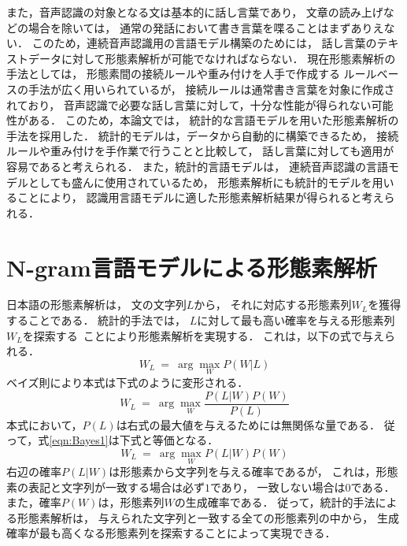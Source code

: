 また，音声認識の対象となる文は基本的に話し言葉であり，
文章の読み上げなどの場合を除いては，
通常の発話において書き言葉を喋ることはまずありえない．
このため，連続音声認識用の言語モデル構築のためには，
話し言葉のテキストデータに対して形態素解析が可能でなければならない．
現在形態素解析の手法としては，
形態素間の接続ルールや重み付けを人手で作成する
ルールベースの手法が広く用いられているが，
接続ルールは通常書き言葉を対象に作成されており，
音声認識で必要な話し言葉に対して，十分な性能が得られない可能性がある．
このため，本論文では，
統計的な言語モデルを用いた形態素解析の手法を採用した．
統計的モデルは，データから自動的に構築できるため，
接続ルールや重み付けを手作業で行うことと比較して，
話し言葉に対しても適用が容易であると考えられる．
また，統計的言語モデルは，
連続音声認識の言語モデルとしても盛んに使用されているため，
形態素解析にも統計的モデルを用いることにより，
認識用言語モデルに適した形態素解析結果が得られると考えられる．



\section{N-gram言語モデルによる形態素解析}
日本語の形態素解析は，
文の文字列$L$から，
それに対応する形態素列$W_L$を獲得することである．
統計的手法では，
$L$に対して最も高い確率を与える形態素列$W_L$\mbox{を探索する
ことにより}形態素解析を実現する．
これは，以下の式で与えられる．
\begin{equation}
W_L ~=~ \arg \max_{W} P(W|L)
\end{equation}
ベイズ則により本式は下式のように変形される．
\begin{equation}
W_L ~=~ \arg \max_W \frac{P(L|W)P(W)}{P(L)}
\label{eqn:Bayes1}
\end{equation}
本式において，$P(L)$は右式の最大値を与えるためには無関係な量である．
従って，式\ref{eqn:Bayes1}は下式と等価となる．
\begin{equation}
W_L ~=~ \arg \max_W P(L|W)P(W)
\end{equation}
右辺の確率$P(L|W)$は形態素から文字列を与える確率であるが，
これは，形態素の表記と文字列が一致する場合は必ず$1$であり，
一致しない場合は$0$である．
また，確率$P(W)$は，形態素列$W$の生成確率である．
従って，統計的手法による形態素解析は，
与えられた文字列と一致する全ての形態素列の中から，
生成確率が最も高くなる形態素列を探索することによって実現できる．

